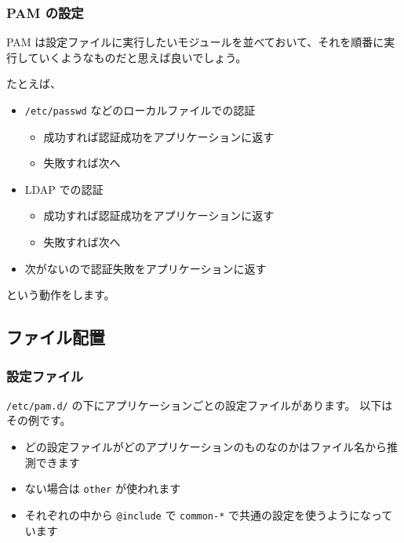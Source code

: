 \documentclass[mingoth,a4paper]{jsarticle}
\begin{document}
\subsubsection{PAM の設定}
\label{sec-1-1-4}

PAM は設定ファイルに実行したいモジュールを並べておいて、それを順番に実行していくようなものだと思えば良いでしょう。

たとえば、
\begin{itemize}
\item \verb~/etc/passwd~ などのローカルファイルでの認証
\begin{itemize}
\item 成功すれば認証成功をアプリケーションに返す
\item 失敗すれば次へ
\end{itemize}
\item LDAP での認証
\begin{itemize}
\item 成功すれば認証成功をアプリケーションに返す
\item 失敗すれば次へ
\end{itemize}
\item 次がないので認証失敗をアプリケーションに返す
\end{itemize}
という動作をします。
\subsection{ファイル配置}
\label{sec-1-2}
\subsubsection{設定ファイル}
\label{sec-1-2-1}

\verb~/etc/pam.d/~ の下にアプリケーションごとの設定ファイルがあります。
以下はその例です。



\begin{itemize}
\item どの設定ファイルがどのアプリケーションのものなのかはファイル名から推測できます
\item ない場合は \verb~other~ が使われます
\item それぞれの中から \verb~@include~ で \verb~common-*~ で共通の設定を使うようになっています
\end{itemize}
\end{document}
